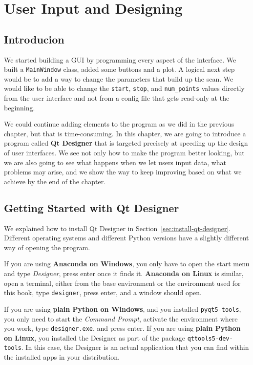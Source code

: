 \chapter{User Input and Designing}\label{ch:user-input-designer}

\section{Introducion}\label{sec:user-input-introduction}
We started building a GUI by programming every aspect of the interface. We built a \texttt{MainWindow} class, added some buttons and a plot. A logical next step would be to add a way to change the parameters that build up the scan. We would like to be able to change the \texttt{start}, \texttt{stop}, and \texttt{num\_points} values directly from the user interface and not from a config file that gets read-only at the beginning.

We could continue adding elements to the program as we did in the previous chapter, but that is time-consuming. In this chapter, we are going to introduce a program called \textbf{Qt Designer} that is targeted precisely at speeding up the design of user interfaces. We see not only how to make the program better looking, but we are also going to see what happens when we let users input data, what problems may arise, and we show the way to keep improving based on what we achieve by the end of the chapter.

\section{Getting Started with Qt Designer}\label{sec:getting-started-with-qt-designer}
We explained how to install Qt Designer in Section~\ref{sec:install-qt-designer}. Different operating systems and different Python versions have a slightly different way of opening the program.

If you are using \textbf{Anaconda on Windows}, you only have to open the start menu and type \textit{Designer}, press \texttt{}enter once it finds it. \textbf{Anaconda on Linux} is similar, open a terminal, either from the base environment or the environment used for this book, type \texttt{designer}, press enter, and a window should open.

If you are using \textbf{plain Python on Windows}, and you installed \texttt{pyqt5-tools}, you only need to start the \emph{Command Prompt}, activate the environment where you work, type \texttt{designer.exe}, and press enter. If you are using \textbf{plain Python on Linux}, you installed the Designer as part of the package \texttt{qttools5-dev-tools}. In this case, the Designer is an actual application that you can find within the installed apps in your distribution.

